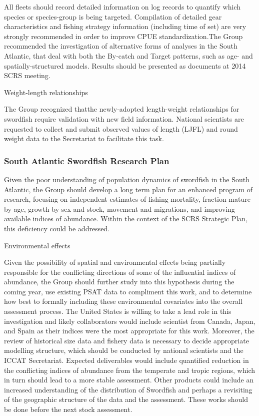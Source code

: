 \documentclass[a4paper,10pt]{article}
\begin{document}
All fleets should record detailed information on log records to quantify which species or species-group is being targeted. Compilation of detailed gear characteristics and fishing strategy information (including time of set) are very strongly recommended in order to improve CPUE standardization.The Group recommended the investigation of alternative forms of analyses in the South Atlantic, that deal with both the By-catch and Target patterns, such as age- and spatially-structured models. Results should be presented as documents at 2014 SCRS meeting.

Weight-length relationships

The Group recognized thatthe newly-adopted length-weight relationships for swordfish require validation with new field information. National scientists are requested to collect and submit observed values of length (LJFL) and round weight data to the Secretariat to facilitate this task.


\subsubsection{South Atlantic Swordfish Research Plan} 

Given the poor understanding of population dynamics of swordfish in the South Atlantic, the Group should develop a long term plan for an enhanced program of research, focusing on independent estimates of fishing mortality, fraction mature by age, growth by sex and stock, movement and migrations, and improving available indices of abundance. Within the context of the SCRS Strategic Plan, this deficiency could be addressed.

Environmental effects

Given the possibility of spatial and environmental effects being partially responsible for the conflicting directions of some of the influential indices of abundance, the Group should further study into this hypothesis during the coming year, use existing PSAT data to compliment this work, and to determine how best to formally including these environmental covariates into the overall assessment process. The United States is willing to take a lead role in this investigation and likely collaborators would include scientist from Canada, Japan, and Spain as their indices were the most appropriate for this work. Moreover, the review of historical size data and fishery data is necessary to decide appropriate modelling structure, which should be conducted by national scientists and the ICCAT Secretariat. Expected deliverables would include quantified reduction in the conflicting indices of abundance from the temperate and tropic regions, which in turn should lead to a more stable assessment. Other products could include an increased understanding of the distribution of Swordfish and perhaps a revisiting of the geographic structure of the data and the assessment. These works should be done before the next stock assessment.
\end{document}
